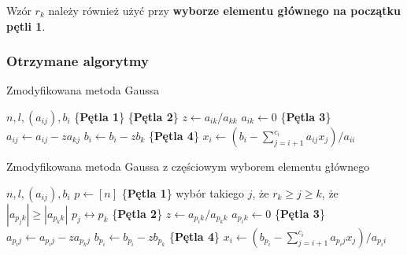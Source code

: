 \documentclass[12pt]{article}
\begin{document}
Wzór $r_k$ należy również użyć przy \textbf{wyborze elementu głównego na początku pętli 1}.

\subsubsection*{Otrzymane algorytmy}

\begin{algorithm} %
\caption{Zmodyfikowana metoda Gaussa}
\label{alg3} %
\begin{algorithmic} %
    \REQUIRE $n, l, (a_{ij}), b_i$
    \STATE \{\textbf{Pętla 1}\}
    		\STATE \{\textbf{Pętla 2}\}
		\STATE $z \leftarrow a_{ik}/a_{kk}$
		\STATE $a_{ik} \leftarrow 0$
    			\STATE \{\textbf{Pętla 3}\}
				\STATE $a_{ij} \leftarrow a_{ij} - z a_{kj}$
    			\ENDFOR
    			\STATE $b_i \leftarrow b_i - z b_k$
    		\ENDFOR
    \ENDFOR
    \STATE \{\textbf{Pętla 4}\}
		\STATE $x_i \leftarrow (b_i - \sum^{c_i}_{j=i+1}a_{ij}x_j)/a_{ii}$
    \ENDFOR
\end{algorithmic}
\end{algorithm}


\clearpage
\begin{algorithm} %
\caption{Zmodyfikowana metoda Gaussa z częściowym wyborem elementu głównego}
\label{alg4} %
\begin{algorithmic} %
    \REQUIRE $n, l, (a_{ij}), b_i$
    \STATE $p \leftarrow [n]$
    \STATE \{\textbf{Pętla 1}\}
		\STATE wybór takiego $j$, że $r_k \geq j \geq k$, że $|a_{p_jk}| \geq |a_{p_kk}|$
		\STATE $p_j \leftrightarrow p_k$
    		\STATE \{\textbf{Pętla 2}\}
		\STATE $z \leftarrow a_{p_ik}/a_{p_kk}$
		\STATE $a_{p_ik} \leftarrow 0$
    			\STATE \{\textbf{Pętla 3}\}
				\STATE $a_{p_ij} \leftarrow a_{p_ij} - z a_{p_kj}$
    			\ENDFOR
    			\STATE $b_{p_i} \leftarrow b_{p_i} - z b_{p_k}$
    		\ENDFOR
    \ENDFOR
    \STATE \{\textbf{Pętla 4}\}
		\STATE $x_i \leftarrow (b_{p_i} - \sum^{c_i}_{j=i+1}a_{p_ij}x_j)/a_{p_ii}$
    \ENDFOR
\end{algorithmic}
\end{algorithm}
\end{document}
